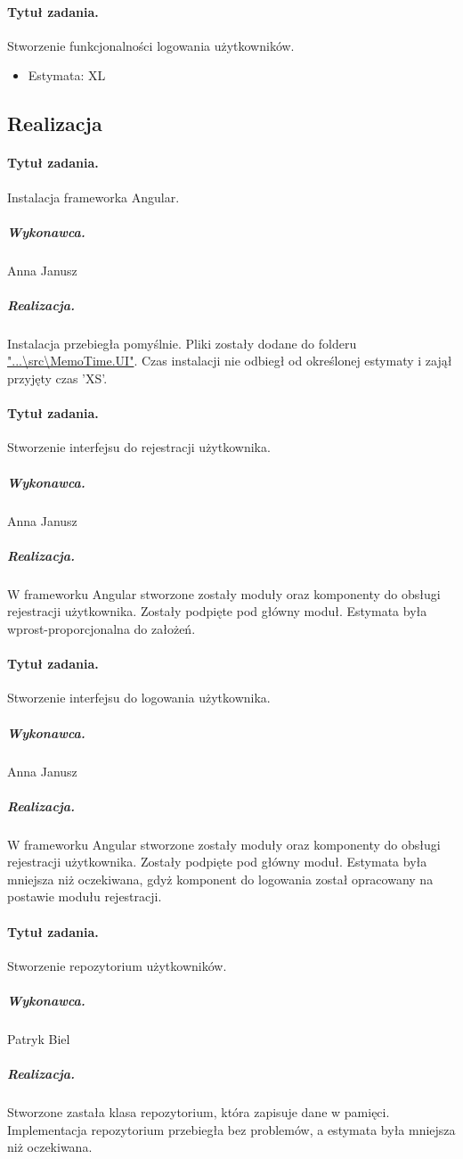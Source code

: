 \documentclass[a4paper]{article}
\begin{document}
\paragraph{Tytuł zadania.} Stworzenie funkcjonalności logowania użytkowników.
\begin{itemize}
\item Estymata: XL
\end{itemize}


\subsection{Realizacja}

\paragraph{Tytuł zadania.} Instalacja frameworka Angular.
\subparagraph{Wykonawca.} Anna Janusz
\subparagraph{Realizacja.} Instalacja przebiegła pomyślnie. Pliki zostały dodane do folderu \url{"...\src\MemoTime.UI"}. Czas instalacji nie odbiegł od określonej estymaty i zajął przyjęty czas 'XS'.


\paragraph{Tytuł zadania.} Stworzenie interfejsu do rejestracji użytkownika.
\subparagraph{Wykonawca.} Anna Janusz
\subparagraph{Realizacja.} W frameworku Angular stworzone zostały moduły oraz komponenty do obsługi rejestracji użytkownika. Zostały podpięte pod główny moduł. Estymata była wprost-proporcjonalna do założeń.


\paragraph{Tytuł zadania.} Stworzenie interfejsu do logowania użytkownika.
\subparagraph{Wykonawca.} Anna Janusz
\subparagraph{Realizacja.} W frameworku Angular stworzone zostały moduły oraz komponenty do obsługi rejestracji użytkownika. Zostały podpięte pod główny moduł. Estymata była mniejsza niż oczekiwana, gdyż komponent do logowania został opracowany na postawie modułu rejestracji.


\paragraph{Tytuł zadania.} Stworzenie repozytorium użytkowników.
\subparagraph{Wykonawca.} Patryk Biel
\subparagraph{Realizacja.} Stworzone zastała klasa repozytorium, która zapisuje dane w pamięci. Implementacja repozytorium przebiegła bez problemów, a estymata była mniejsza niż oczekiwana.
\end{document}
